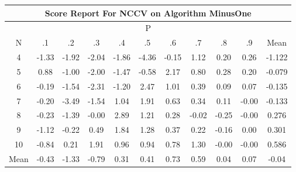 \documentclass[11pt,a4paper]{report}
\begin{document}
\begin{longtable}{ | c || c | c | c | c | c | c | c | c | c || c |}
\hline
\multicolumn{11}{|c|}{ Score Report For NCCV on Algorithm MinusOne} \\
\hline
\multicolumn{11}{|c|}{ P } \\
\hline
N & .1 & .2 & .3 & .4 & .5 & .6 & .7 & .8 & .9 & Mean\\
 \hline
 \hline
 \endhead
  4 &  \cellcolor[HTML]{FFDFDF} -1.33 &  \cellcolor[HTML]{FFCFCF} -1.92 &  \cellcolor[HTML]{FFCFCF} -2.04 &  \cellcolor[HTML]{FFCFCF} -1.86 &  \cellcolor[HTML]{FF8F8F} -4.36 &  \cellcolor[HTML]{FFFFFF} -0.15 &  \cellcolor[HTML]{DFDFFF} 1.12 &  \cellcolor[HTML]{F7F7FF} 0.20 &  \cellcolor[HTML]{F7F7FF} 0.26 & -1.122 \\
  5 &  \cellcolor[HTML]{E7E7FF} 0.88 &  \cellcolor[HTML]{FFE7E7} -1.00 &  \cellcolor[HTML]{FFCFCF} -2.00 &  \cellcolor[HTML]{FFD7D7} -1.47 &  \cellcolor[HTML]{FFEFEF} -0.58 &  \cellcolor[HTML]{C7C7FF} 2.17 &  \cellcolor[HTML]{E7E7FF} 0.80 &  \cellcolor[HTML]{F7F7FF} 0.28 &  \cellcolor[HTML]{F7F7FF} 0.20 & -0.079 \\
  6 &  \cellcolor[HTML]{FFF7F7} -0.19 &  \cellcolor[HTML]{FFD7D7} -1.54 &  \cellcolor[HTML]{FFC7C7} -2.31 &  \cellcolor[HTML]{FFDFDF} -1.20 &  \cellcolor[HTML]{BFBFFF} 2.47 &  \cellcolor[HTML]{E7E7FF} 1.01 &  \cellcolor[HTML]{F7F7FF} 0.39 &  \cellcolor[HTML]{FFFFFF} 0.09 &  \cellcolor[HTML]{FFFFFF} 0.07 & -0.135 \\
  7 &  \cellcolor[HTML]{FFF7F7} -0.20 &  \cellcolor[HTML]{FFA7A7} -3.49 &  \cellcolor[HTML]{FFD7D7} -1.54 &  \cellcolor[HTML]{E7E7FF} 1.04 &  \cellcolor[HTML]{CFCFFF} 1.91 &  \cellcolor[HTML]{EFEFFF} 0.63 &  \cellcolor[HTML]{F7F7FF} 0.34 &  \cellcolor[HTML]{FFFFFF} 0.11 &  \cellcolor[HTML]{FFFFFF} -0.00 & -0.133 \\
  8 &  \cellcolor[HTML]{FFF7F7} -0.23 &  \cellcolor[HTML]{FFDFDF} -1.39 &  \cellcolor[HTML]{FFFFFF} -0.00 &  \cellcolor[HTML]{B7B7FF} 2.89 &  \cellcolor[HTML]{DFDFFF} 1.21 &  \cellcolor[HTML]{F7F7FF} 0.28 &  \cellcolor[HTML]{FFFFFF} -0.02 &  \cellcolor[HTML]{FFF7F7} -0.25 &  \cellcolor[HTML]{FFFFFF} -0.00 & 0.276 \\
  9 &  \cellcolor[HTML]{FFDFDF} -1.12 &  \cellcolor[HTML]{FFF7F7} -0.22 &  \cellcolor[HTML]{EFEFFF} 0.49 &  \cellcolor[HTML]{CFCFFF} 1.84 &  \cellcolor[HTML]{DFDFFF} 1.28 &  \cellcolor[HTML]{F7F7FF} 0.37 &  \cellcolor[HTML]{F7F7FF} 0.22 &  \cellcolor[HTML]{FFFFFF} -0.16 &  \cellcolor[HTML]{FFFFFF} 0.00 & 0.301 \\
  10 &  \cellcolor[HTML]{FFE7E7} -0.84 &  \cellcolor[HTML]{F7F7FF} 0.21 &  \cellcolor[HTML]{CFCFFF} 1.91 &  \cellcolor[HTML]{E7E7FF} 0.96 &  \cellcolor[HTML]{E7E7FF} 0.94 &  \cellcolor[HTML]{EFEFFF} 0.78 &  \cellcolor[HTML]{DFDFFF} 1.30 &  \cellcolor[HTML]{FFFFFF} -0.00 &  \cellcolor[HTML]{FFFFFF} -0.00 & 0.586 \\
 \hline
 \hline
Mean &  \cellcolor[HTML]{FFF7F7} -0.43 &  \cellcolor[HTML]{FFDFDF} -1.33 &  \cellcolor[HTML]{FFEFEF} -0.79 &  \cellcolor[HTML]{F7F7FF} 0.31 &  \cellcolor[HTML]{F7F7FF} 0.41 &  \cellcolor[HTML]{EFEFFF} 0.73 &  \cellcolor[HTML]{EFEFFF} 0.59 &  \cellcolor[HTML]{FFFFFF} 0.04 &  \cellcolor[HTML]{FFFFFF} 0.07 &  \cellcolor[HTML]{FFFFFF} -0.04
\end{longtable}
\end{document}
